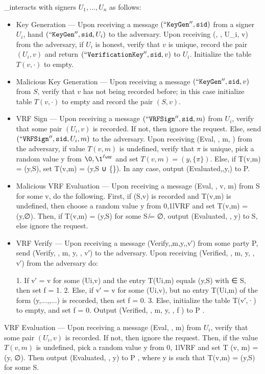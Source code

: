 \calF_\VRF interacts with signers $U_1,\ldots,U_n$ as follows:
\begin{itemize}
\item  Key Generation --- Upon receiving a message $(\mathtt{``KeyGen''},\mathtt{sid})$ from a signer $U_i$, hand
$(\mathtt{``KeyGen''}, \mathtt{sid}, U_i)$ to the adversary. Upon receiving (, \sid, U_i, v) from the adversary, if $U_i$ is honest, verify that $v$ is unique, record the pair $(U_i, v)$ and return $(\mathtt{``VerificationKey''}, \mathtt{sid}, v)$ to $U_i$. Initialize the table $T(v,\cdot)$ to empty.
\item  Malicious Key Generation --- Upon receiving a message $(\mathtt{``KeyGen''},\mathtt{sid},v)$ from $S$, verify that $v$ has not being recorded before; in this case initialize table $T(v,\cdot)$ to empty and record the pair $(S,v)$.

\item  VRF Sign --- Upon receiving a message $(\mathtt{``VRFSign''},\mathtt{sid},m)$ from $U_i$, verify that some pair $(U_i, v)$ is recorded. If not, then ignore the request. Else, send $(\mathtt{``VRFSign''}, \mathtt{sid}, U_i, m)$ to the adversary. Upon receiving (Eval, \sid, m, \pi) from the adversary, if value $T(v, m)$ is undefined, verify that $\pi$ is unique, pick a random value y from ${\0, \1}^{\ell_\VRF}$ and set $T(v, m) = (y, \{\pi\})$. Else, if T(v,m) = (y,S), set T(v,m) = (y,S ∪ \{\pi\}). In any case, output (Evaluated,\sid,y,\pi) to P.

\item  Malicious VRF Evaluation --- Upon receiving a message (Eval, \sid, v, m) from S for some v, do the following. First, if (S,v) is recorded and T(v,m) is undefined, then choose a random value y from {0,1}lVRF and set T(v,m) = (y,∅). Then, if T(v,m) = (y,S) for some S ̸= ∅, output
(Evaluated, \sid, y) to S, else ignore the request.

\item VRF Verify --- Upon receiving a message (Verify,\sid,m,y,\pi,v′) from some party P, send
(Verify, \sid, m, y, \pi, v′) to the adversary. Upon receiving (Verified, \sid, m, y, \pi, v′) from the adversary do:
\begin{enumerate}
1. If v′ = v for some (Ui,v) and the entry T(Ui,m) equals (y,S) with \pi ∈ S, then set f = 1.
2. Else, if v′ = v for some (Ui,v), but no entry T(Ui,m) of the form (y,{...,\pi,...}) is recorded,
then set f = 0.
3. Else, initialize the table T(v′,·) to empty, and set f = 0.
Output (Verified, \sid, m, y, \pi, f ) to P .
\end{enumerate}
\end{itemize}





\item  VRF Evaluation --- Upon receiving a message (Eval, \sid, m) from $U_i$, verify that some pair $(U_i, v)$
is recorded. If not, then ignore the request. Then, if the value $T(v,m)$ is undefined, pick a random value y from {0, 1}lVRF and set T (v, m) = (y, ∅). Then output (Evaluated, \sid, y) to P , where y is such that T(v,m) = (y,S) for some S.



